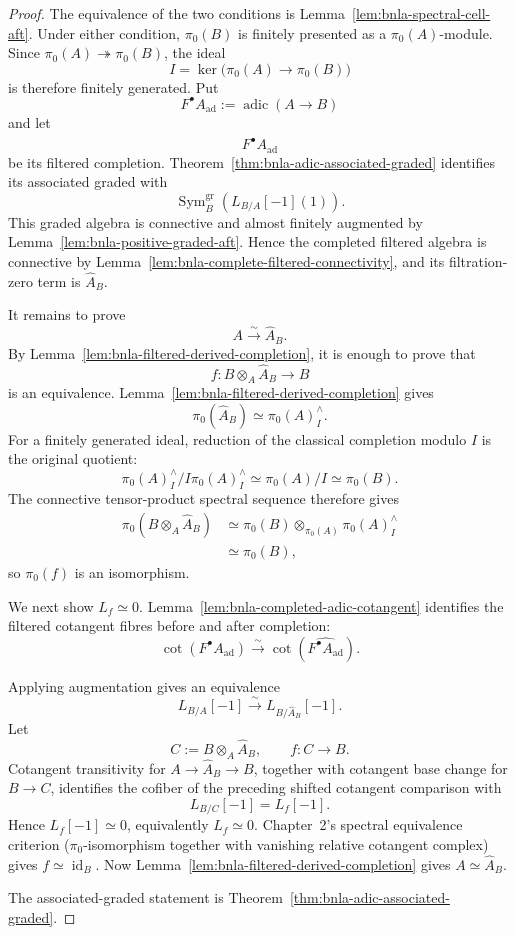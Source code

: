 \begin{proof}
The equivalence of the two conditions is
Lemma~\ref{lem:bnla-spectral-cell-aft}.  Under either condition,
$\pi_0(B)$ is finitely presented as a $\pi_0(A)$-module.  Since
$\pi_0(A)\twoheadrightarrow\pi_0(B)$, the ideal
\[
    I=\ker\bigl(\pi_0(A)\to\pi_0(B)\bigr)
\]
is therefore finitely generated.  Put
\[
    F^\bullet A_{\mathrm{ad}}
    :=
    \operatorname{adic}(A\to B)
\]
and let
\[
    \widehat{F^\bullet A_{\mathrm{ad}}}
\]
be its filtered completion.  Theorem~\ref{thm:bnla-adic-associated-graded}
identifies its associated graded with
\[
    \operatorname{Sym}^{\mathrm{gr}}_B(L_{B/A}[-1](1)).
\]
This graded algebra is connective and almost finitely augmented by
Lemma~\ref{lem:bnla-positive-graded-aft}.  Hence the completed filtered
algebra is connective by
Lemma~\ref{lem:bnla-complete-filtered-connectivity}, and its filtration-zero
term is $\widehat A_B$.

It remains to prove
\[
    A\xrightarrow{\sim}\widehat A_B.
\]
By Lemma~\ref{lem:bnla-filtered-derived-completion}, it is enough to prove
that
\[
    f:
    B\otimes_A\widehat A_B
    \longrightarrow
    B
\]
is an equivalence.  Lemma~\ref{lem:bnla-filtered-derived-completion} gives
\[
    \pi_0(\widehat A_B)
    \simeq
    \pi_0(A)^\wedge_I.
\]
For a finitely generated ideal, reduction of the classical completion modulo
$I$ is the original quotient:
\[
    \pi_0(A)^\wedge_I/I\pi_0(A)^\wedge_I
    \simeq
    \pi_0(A)/I
    \simeq
    \pi_0(B).
\]
The connective tensor-product spectral sequence therefore gives
\[
\begin{aligned}
    \pi_0(B\otimes_A\widehat A_B)
    &\simeq
    \pi_0(B)\otimes_{\pi_0(A)}\pi_0(A)^\wedge_I\\
    &\simeq
    \pi_0(B),
\end{aligned}
\]
so $\pi_0(f)$ is an isomorphism.

We next show $L_f\simeq0$.
Lemma~\ref{lem:bnla-completed-adic-cotangent} identifies the filtered
cotangent fibres before and after completion:
\[
    \operatorname{cot}(F^\bullet A_{\mathrm{ad}})
    \xrightarrow{\sim}
    \operatorname{cot}
    \left(
        \widehat{F^\bullet A_{\mathrm{ad}}}
    \right).
\]

Applying augmentation gives an equivalence
\[
    L_{B/A}[-1]
    \xrightarrow{\sim}
    L_{B/\widehat A_B}[-1].
\]
Let
\[
    C:=B\otimes_A\widehat A_B,
    \qquad
    f:C\longrightarrow B.
\]
Cotangent transitivity for $A\to\widehat A_B\to B$, together with cotangent
base change for $B\to C$, identifies the cofiber of the preceding shifted
cotangent comparison with
\[
    L_{B/C}[-1]=L_f[-1].
\]
Hence $L_f[-1]\simeq0$, equivalently $L_f\simeq0$.  Chapter~2's spectral
equivalence criterion
($\pi_0$-isomorphism together with vanishing relative cotangent complex)
gives $f\simeq\operatorname{id}_B$.  Now
Lemma~\ref{lem:bnla-filtered-derived-completion} gives
$A\simeq\widehat A_B$.

The associated-graded statement is
Theorem~\ref{thm:bnla-adic-associated-graded}.
\end{proof}

